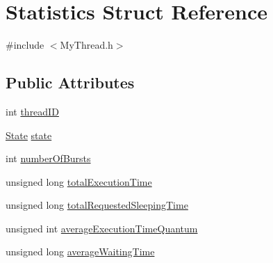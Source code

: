 \hypertarget{structStatistics}{\section{Statistics Struct Reference}
\label{structStatistics}
}


{\ttfamily \#include $<$My\-Thread.\-h$>$}

\subsection*{Public Attributes}
\begin{DoxyCompactItemize}
\item 
int \hyperlink{structStatistics_a9d680436e74c07fba13fcaba9671784f}{thread\-I\-D}
\item 
\hyperlink{MyThread_8h_a5d74787dedbc4e11c1ab15bf487e61f8}{State} \hyperlink{structStatistics_a1ae3df783f2d75732c9832265532150d}{state}
\item 
int \hyperlink{structStatistics_aecbead175661a5b03a0a80d492e1bad4}{number\-Of\-Bursts}
\item 
unsigned long \hyperlink{structStatistics_aad62afe8a70e7a16f7e27dcd336b4a6a}{total\-Execution\-Time}
\item 
unsigned long \hyperlink{structStatistics_a38503577532e0d274f2bbaac05b19c88}{total\-Requested\-Sleeping\-Time}
\item 
unsigned int \hyperlink{structStatistics_a69a377cee18cdf24f47592504ba607ee}{average\-Execution\-Time\-Quantum}
\item 
unsigned long \hyperlink{structStatistics_ab6750dc913f6b98057167637930617c8}{average\-Waiting\-Time}
\end{DoxyCompactItemize}


